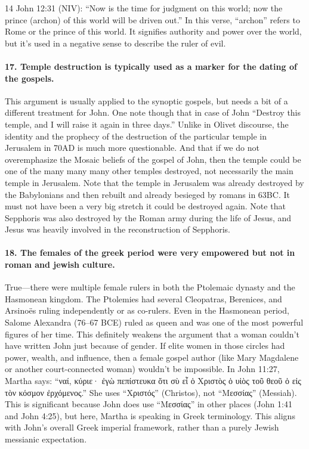14 John 12:31 (NIV): ``Now is the time for judgment on this world; now the prince (archon) of this world will be driven out.'' In this verse, ``archon'' refers to Rome or the prince of this world.
It signifies authority and power over the world, but it's used in a negative sense to describe the ruler of evil.

\paragraph{17.
Temple destruction is typically used as a marker for the dating of the gospels.}\label{par:temple-destruction-is-typically-used-as-a-marker-for-the-dating-of-the-gospels.}

This argument is usually applied to the synoptic gospels, but needs a bit of a different treatment for John.
One note though that in case of John ``Destroy this temple, and I will raise it again in three days.'' Unlike in Olivet discourse, the identity and the prophecy of the destruction of the particular temple in Jerusalem in 70AD is much more questionable.
And that if we do not overemphasize the Mosaic beliefs of the gospel of John, then the temple could be one of the many many many other temples destroyed, not necessarily the main temple in Jerusalem.
Note that the temple in Jerusalem was already destroyed by the Babylonians and then rebuilt and already besieged by romans in 63BC.
It must not have been a very big stretch it could be destroyed again.
Note that Sepphoris was also destroyed by the Roman army during the life of Jesus, and Jesus was heavily involved in the reconstruction of Sepphoris.

\paragraph{18.
The females of the greek period were very empowered but not in roman and jewish culture.}\label{par:the-females-of-the-greek-period-were-very-empowered-but-not-in-roman-and-jewish-culture.}

True---there were multiple female rulers in both the Ptolemaic dynasty and the Hasmonean kingdom.
The Ptolemies had several Cleopatras, Berenices, and Arsinoës ruling independently or as co-rulers.
Even in the Hasmonean period, Salome Alexandra (76--67 BCE) ruled as queen and was one of the most powerful figures of her time.
This definitely weakens the argument that a woman couldn't have written John just because of gender.
If elite women in those circles had power, wealth, and influence, then a female gospel author (like Mary Magdalene or another court-connected woman) wouldn't be impossible.
In John 11:27, Martha says: ``ναί, κύριε· ἐγὼ πεπίστευκα ὅτι σὺ εἶ ὁ Χριστὸς ὁ υἱὸς τοῦ θεοῦ ὁ εἰς τὸν κόσμον ἐρχόμενος.'' She uses ``Χριστός'' (Christos), not ``Μεσσίας'' (Messiah).
This is significant because John does use ``Μεσσίας'' in other places (John 1:41 and John 4:25), but here, Martha is speaking in Greek terminology.
This aligns with John's overall Greek imperial framework, rather than a purely Jewish messianic expectation.

